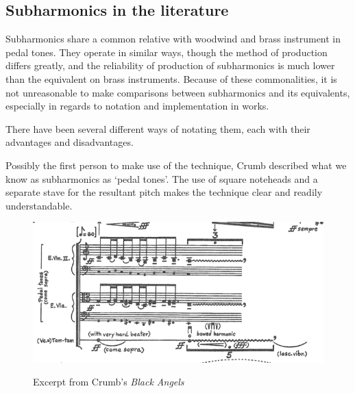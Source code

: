 \subsection{Subharmonics in the literature}

Subharmonics share a common relative with woodwind and brass instrument in pedal tones.
They operate in similar ways, though the method of production differs greatly, and the reliability of production of subharmonics is much lower than the equivalent on brass instruments.
Because of these commonalities, it is not unreasonable to make comparisons between subharmonics and its equivalents, especially in regards to notation and implementation in works.

There have been several different ways of notating them, each with their advantages and disadvantages.



Possibly the first person to make use of the technique, Crumb described what we know as subharmonics as `pedal tones'.\autocite{crumbBlackAngelsImages1971} 
The use of square noteheads and a separate stave for the resultant pitch makes the technique clear and readily understandable.
\begin{figure}
    \includegraphics[width=\linewidth]{./resources/crumbBlackAngels.png}
    \caption{Excerpt from Crumb's \emph{Black Angels}}\autocite[]{crumbBlackAngels1995}
\label{fig:Excerpt from Crumb's Black Angels}
  \end{figure}

